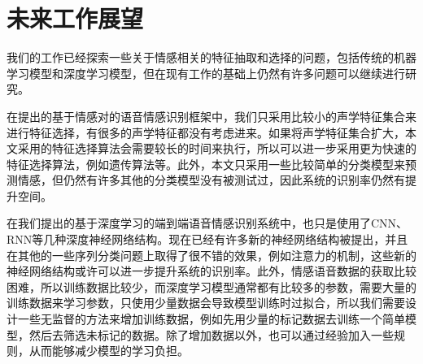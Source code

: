 \section{未来工作展望}
\label{sec:prospect}

我们的工作已经探索一些关于情感相关的特征抽取和选择的问题，包括传统的机器学习模型和深度学习模型，但在现有工作的基础上仍然有许多问题可以继续进行研究。

在提出的基于情感对的语音情感识别框架中，我们只采用比较小的声学特征集合来进行特征选择，有很多的声学特征都没有考虑进来。如果将声学特征集合扩大，本文采用的特征选择算法会需要较长的时间来执行，所以可以进一步采用更为快速的特征选择算法，例如遗传算法等。此外，本文只采用一些比较简单的分类模型来预测情感，但仍然有许多其他的分类模型没有被测试过，因此系统的识别率仍然有提升空间。

在我们提出的基于深度学习的端到端语音情感识别系统中，也只是使用了CNN、RNN等几种深度神经网络结构。现在已经有许多新的神经网络结构被提出，并且在其他的一些序列分类问题上取得了很不错的效果，例如注意力的机制，这些新的神经网络结构或许可以进一步提升系统的识别率。此外，情感语音数据的获取比较困难，所以训练数据比较少，而深度学习模型通常都有比较多的参数，需要大量的训练数据来学习参数，只使用少量数据会导致模型训练时过拟合，所以我们需要设计一些无监督的方法来增加训练数据，例如先用少量的标记数据去训练一个简单模型，然后去筛选未标记的数据。除了增加数据以外，也可以通过经验加入一些规则，从而能够减少模型的学习负担。